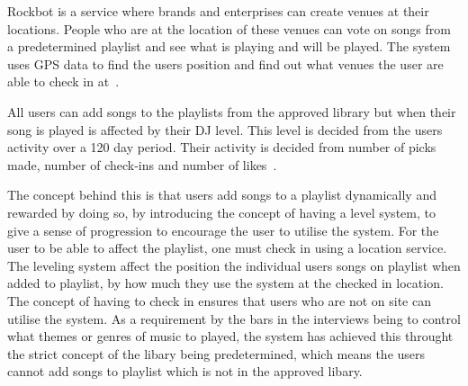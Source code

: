 Rockbot is a service where brands and enterprises can create venues at their locations. People who are at the location of these venues can vote on songs from a predetermined playlist and see what is playing and will be played. The system uses GPS data to find the users position and find out what venues the user are able to check in at~\cite{rockbotFeatures}.

All users can add songs to the playlists from the approved library but when their song is played is affected by their DJ level. This level is decided from the users activity over a 120 day period. Their activity is decided from number of picks made, number of check-ins and number of likes~\cite{rockbotBlog}.

The concept behind this is that users add songs to a playlist dynamically and rewarded by doing so, by introducing the concept of having a level system, to give a sense of progression to encourage the user to utilise the system. For the user to be able to affect the playlist, one must check in using a location service. The leveling system affect the position the individual users songs on playlist when added to playlist, by how much they use the system at the checked in location. The concept of having to check in ensures that users who are not on site can utilise the system.
As a requirement by the bars in the interviews being to control what themes or genres of music to played, the system has achieved this throught the strict concept of the libary being predetermined, which means the users cannot add songs to playlist which is not in the approved libary. 